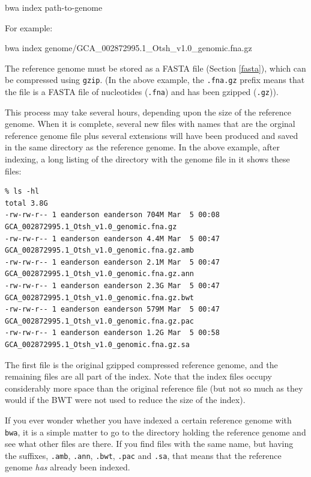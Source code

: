 \documentclass[]{krantz}
\makeatletter
\newenvironment{Shaded}{\begin{snugshade}}{\end{snugshade}}
\newcommand{\ExtensionTok}[1]{#1}
\newcommand{\NormalTok}[1]{#1}
\newenvironment{kframe}{%
\medskip{}
\setlength{\fboxsep}{.8em}
 \def\at@end@of@kframe{}%
 \ifinner\ifhmode%
  \def\at@end@of@kframe{\end{minipage}}%
  \begin{minipage}{\columnwidth}%
 \fi\fi%
 \def\FrameCommand##1{\hskip\@totalleftmargin \hskip-\fboxsep
 \colorbox{shadecolor}{##1}\hskip-\fboxsep
     \hskip-\linewidth \hskip-\@totalleftmargin \hskip\columnwidth}%
 \MakeFramed {\advance\hsize-\width
   \@totalleftmargin\z@ \linewidth\hsize
   \@setminipage}}%
 {\par\unskip\endMakeFramed%
 \at@end@of@kframe}
\renewenvironment{Shaded}{\begin{kframe}}{\end{kframe}}
\makeatother
\begin{document}
\begin{Shaded}
\begin{Highlighting}[]
\ExtensionTok{bwa}\NormalTok{ index path-to-genome}
\end{Highlighting}
\end{Shaded}

For example:

\begin{Shaded}
\begin{Highlighting}[]
\ExtensionTok{bwa}\NormalTok{ index genome/GCA_002872995.1_Otsh_v1.0_genomic.fna.gz}
\end{Highlighting}
\end{Shaded}

The reference genome must be stored as a FASTA file (Section \ref{fasta}), which can
be compressed using \texttt{gzip}. (In the above example, the \texttt{.fna.gz} prefix means that the
file is a FASTA file of nucleotides (\texttt{.fna}) and has been gzipped (\texttt{.gz})).

This process may take several hours, depending upon the size of the reference
genome. When it is complete, several new files with names that are the
orginal reference genome file plus several extensions will have been produced
and saved in the same directory as the reference genome. In the above example,
after indexing, a long listing of the directory with the genome file in it
shows these files:

\begin{verbatim}
% ls -hl
total 3.8G
-rw-rw-r-- 1 eanderson eanderson 704M Mar  5 00:08 GCA_002872995.1_Otsh_v1.0_genomic.fna.gz
-rw-rw-r-- 1 eanderson eanderson 4.4M Mar  5 00:47 GCA_002872995.1_Otsh_v1.0_genomic.fna.gz.amb
-rw-rw-r-- 1 eanderson eanderson 2.1M Mar  5 00:47 GCA_002872995.1_Otsh_v1.0_genomic.fna.gz.ann
-rw-rw-r-- 1 eanderson eanderson 2.3G Mar  5 00:47 GCA_002872995.1_Otsh_v1.0_genomic.fna.gz.bwt
-rw-rw-r-- 1 eanderson eanderson 579M Mar  5 00:47 GCA_002872995.1_Otsh_v1.0_genomic.fna.gz.pac
-rw-rw-r-- 1 eanderson eanderson 1.2G Mar  5 00:58 GCA_002872995.1_Otsh_v1.0_genomic.fna.gz.sa
\end{verbatim}

The first file is the original gzipped compressed reference genome, and the remaining files
are all part of the index. Note that the index files occupy considerably more space than
the original reference file (but not so much as they would if the BWT were not used to
reduce the size of the index).

If you ever wonder whether you have indexed a certain reference genome with \texttt{bwa}, it is
a simple matter to go to the directory holding the reference genome and see what other files
are there. If you find files with the same name, but having the suffixes, \texttt{.amb}, \texttt{.ann}, \texttt{.bwt}, \texttt{.pac}
and \texttt{.sa}, that means that the reference genome \emph{has} already been indexed.
\end{document}
